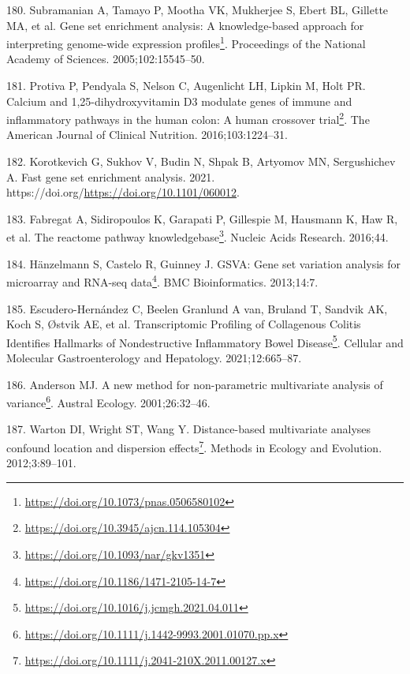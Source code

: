 \documentclass[
  a4paper,
]{book}
\DeclareRobustCommand{\href}[2]{#2\footnote{\url{#1}}}
\newlength{\cslhangindent}
\newlength{\cslentryspacingunit} %
\newenvironment{CSLReferences}[2] %
 {%
  \setlength{\parindent}{0pt}
  \ifodd #1
  \let\oldpar\par
  \def\par{\hangindent=\cslhangindent\oldpar}
  \fi
  \setlength{\parskip}{#2\cslentryspacingunit}
 }%
 {}
\begin{document}
\begin{CSLReferences}{0}{0}
\leavevmode{}%
180. Subramanian A, Tamayo P, Mootha VK, Mukherjee S, Ebert BL, Gillette MA, et al. \href{https://doi.org/10.1073/pnas.0506580102}{Gene set enrichment analysis: A knowledge-based approach for interpreting genome-wide expression profiles}. Proceedings of the National Academy of Sciences. 2005;102:15545--50.

\leavevmode{}%
181. Protiva P, Pendyala S, Nelson C, Augenlicht LH, Lipkin M, Holt PR. \href{https://doi.org/10.3945/ajcn.114.105304}{Calcium and 1,25-dihydroxyvitamin D3 modulate genes of immune and inflammatory pathways in the human colon: A human crossover trial}. The American Journal of Clinical Nutrition. 2016;103:1224--31.

\leavevmode{}%
182. Korotkevich G, Sukhov V, Budin N, Shpak B, Artyomov MN, Sergushichev A. Fast gene set enrichment analysis. 2021. https://doi.org/\url{https://doi.org/10.1101/060012}.

\leavevmode{}%
183. Fabregat A, Sidiropoulos K, Garapati P, Gillespie M, Hausmann K, Haw R, et al. \href{https://doi.org/10.1093/nar/gkv1351}{The reactome pathway knowledgebase}. Nucleic Acids Research. 2016;44.

\leavevmode{}%
184. Hänzelmann S, Castelo R, Guinney J. \href{https://doi.org/10.1186/1471-2105-14-7}{GSVA: Gene set variation analysis for microarray and RNA-seq data}. BMC Bioinformatics. 2013;14:7.

\leavevmode{}%
185. Escudero-Hernández C, Beelen Granlund A van, Bruland T, Sandvik AK, Koch S, Østvik AE, et al. \href{https://doi.org/10.1016/j.jcmgh.2021.04.011}{Transcriptomic Profiling of Collagenous Colitis Identifies Hallmarks of Nondestructive Inflammatory Bowel Disease}. Cellular and Molecular Gastroenterology and Hepatology. 2021;12:665--87.

\leavevmode{}%
186. Anderson MJ. \href{https://doi.org/10.1111/j.1442-9993.2001.01070.pp.x}{A new method for non-parametric multivariate analysis of variance}. Austral Ecology. 2001;26:32--46.

\leavevmode{}%
187. Warton DI, Wright ST, Wang Y. \href{https://doi.org/10.1111/j.2041-210X.2011.00127.x}{Distance-based multivariate analyses confound location and dispersion effects}. Methods in Ecology and Evolution. 2012;3:89--101.


\end{CSLReferences}
\end{document}
